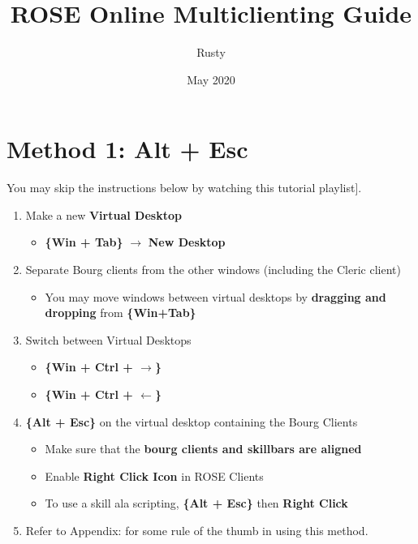 \documentclass{article}
\title{ROSE Online Multiclienting Guide}
\author{Rusty}
\date{May 2020}
\begin{document}
\maketitle

\section{Method 1: Alt + Esc}
\label{section: method1}

You may skip the instructions below by watching this \href{https://www.youtube.com/watch?v=Loo_phNvK50&list=PLVUbtDqG7l80KYJ2zmCmPpPKnN2rwKMex}{}tutorial playlist].

\begin{enumerate}
   \item Make a new \textbf{Virtual Desktop}
   \begin{itemize}
     \item \textbf{\{Win + Tab\}} $\rightarrow$ \textbf{New Desktop}
   \end{itemize}
   \item Separate Bourg clients from the other windows (including the Cleric client)
   \begin{itemize}
     \item You may move windows between virtual desktops by \textbf{dragging and dropping} from \textbf{\{Win+Tab\}}
   \end{itemize}
   \item Switch between Virtual Desktops
   \begin{itemize}
     \item \textbf{\{Win + Ctrl + $\rightarrow$\}}
     \item \textbf{\{Win + Ctrl + $\leftarrow$\}}
   \end{itemize}
   \item \textbf{\{Alt + Esc\}} on the virtual desktop containing the Bourg Clients
   \begin{itemize}
     \item Make sure that the \textbf{bourg clients and skillbars are aligned}
     \item Enable \textbf{Right Click Icon} in ROSE Clients
     \item To use a skill ala scripting, \textbf{\{Alt + Esc\}} then \textbf{Right Click }
   \end{itemize}
   \item Refer to Appendix:  for some rule of the thumb in using this method.
 
\end{enumerate}
\end{document}
